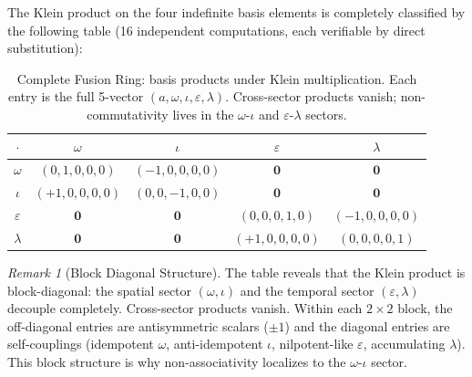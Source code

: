 \documentclass[12pt,oneside]{article}
\theoremstyle{principia}
\theoremstyle{definition}
\theoremstyle{remark}
\newtheorem{remark}[theorem]{Remark}
\providecommand{\eps}{\varepsilon}
\providecommand{\lam}{\lambda}
\begin{document}
The Klein product on the four indefinite basis elements is completely classified by the following table (16 independent computations, each verifiable by direct substitution):

\begin{table}[!ht]
\centering\small
\caption{Complete Fusion Ring: basis products under Klein multiplication. Each entry is the full 5-vector $(a, \omega, \iota, \eps, \lam)$. Cross-sector products vanish; non-commutativity lives in the $\omega$-$\iota$ and $\eps$-$\lam$ sectors.}
\label{tab:fusion}
\begin{tabular}{@{}c|cccc@{}}
\toprule
$\cdot$ & $\omega$ & $\iota$ & $\eps$ & $\lam$ \\
\midrule
$\omega$ & $(0,1,0,0,0)$ & $(-1,0,0,0,0)$ & $\mathbf{0}$ & $\mathbf{0}$ \\
$\iota$ & $(+1,0,0,0,0)$ & $(0,0,-1,0,0)$ & $\mathbf{0}$ & $\mathbf{0}$ \\
$\eps$ & $\mathbf{0}$ & $\mathbf{0}$ & $(0,0,0,1,0)$ & $(-1,0,0,0,0)$ \\
$\lam$ & $\mathbf{0}$ & $\mathbf{0}$ & $(+1,0,0,0,0)$ & $(0,0,0,0,1)$ \\
\bottomrule
\end{tabular}
\end{table}

\begin{remark}[Block Diagonal Structure]
The table reveals that the Klein product is block-diagonal: the spatial sector $(\omega, \iota)$ and the temporal sector $(\eps, \lam)$ decouple completely. Cross-sector products vanish. Within each $2 \times 2$ block, the off-diagonal entries are antisymmetric scalars ($\pm 1$) and the diagonal entries are self-couplings (idempotent $\omega$, anti-idempotent $\iota$, nilpotent-like $\eps$, accumulating $\lam$). This block structure is why non-associativity localizes to the $\omega$-$\iota$ sector.
\end{remark}
\end{document}
